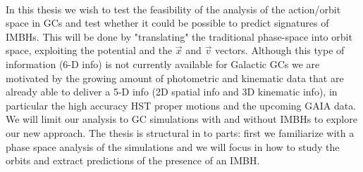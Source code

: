 \\\par In this thesis we wish to test the feasibility of the analysis of the action/orbit space in \acp{GC} and test whether it could be possible to predict  signatures of \acp{IMBH}. This will be done by "translating" the traditional phase-space into orbit space, exploiting the potential and the \(\vec{x}\) and \(\vec{v}\) vectors. Although this type of information (6-D info) is not currently available for Galactic \acp{GC} we are motivated by the growing amount of photometric and kinematic data that are already able to deliver a 5-D info (2D spatial info and 3D kinematic info), in particular the high accuracy \ac{HST} proper motions and the upcoming GAIA data. We will limit our analysis to \ac{GC} simulations with and without \acp{IMBH} to explore our new approach. The thesis is structural in to parts: first we familiarize with a phase space analysis of the simulations and we will focus in how to study the orbits and extract predictions of the presence of an \ac{IMBH}.

